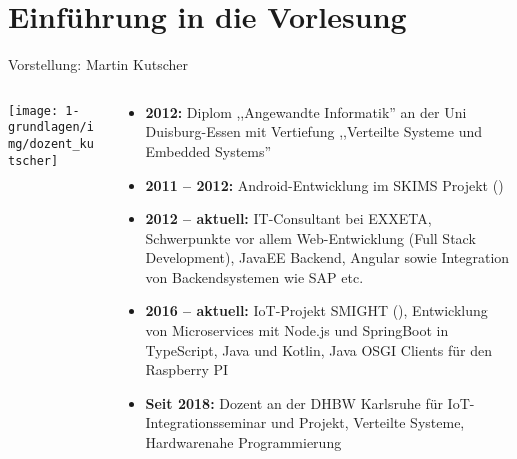 \section{Einführung in die Vorlesung}

\begin{frame}{Vorstellung: Martin Kutscher}
    \begin{columns}
        \begin{column}{.2\textwidth}
            \begin{center}
                \texttt{[image: 1-grundlagen/img/dozent\_kutscher]}
            \end{center}
        \end{column}
        \begin{column}{.8\textwidth}
            \begin{itemize}
                \item \textbf{2012:} Diplom ,,Angewandte Informatik''  an der Uni Duisburg-Essen
                mit Vertiefung ,,Verteilte Systeme und Embedded Systems''

                \item \textbf{2011 -- 2012:} Android-Entwicklung im SKIMS Projekt
                ()

                \item \textbf{2012 -- aktuell:} IT-Consultant bei EXXETA, Schwerpunkte vor allem
                Web-Entwicklung (Full Stack Development), JavaEE Backend, Angular sowie Integration
                von Backendsystemen wie SAP etc.

                \item \textbf{2016 -- aktuell:} IoT-Projekt SMIGHT (),
                Entwicklung von Microservices mit Node.js und SpringBoot in TypeScript, Java und
                Kotlin, Java OSGI Clients für den Raspberry PI

                \item \textbf{Seit 2018:} Dozent an der DHBW Karlsruhe für
                IoT-Integrationsseminar und Projekt, Verteilte Systeme, Hardwarenahe Programmierung
            \end{itemize}
        \end{column}
    \end{columns}
\end{frame}

